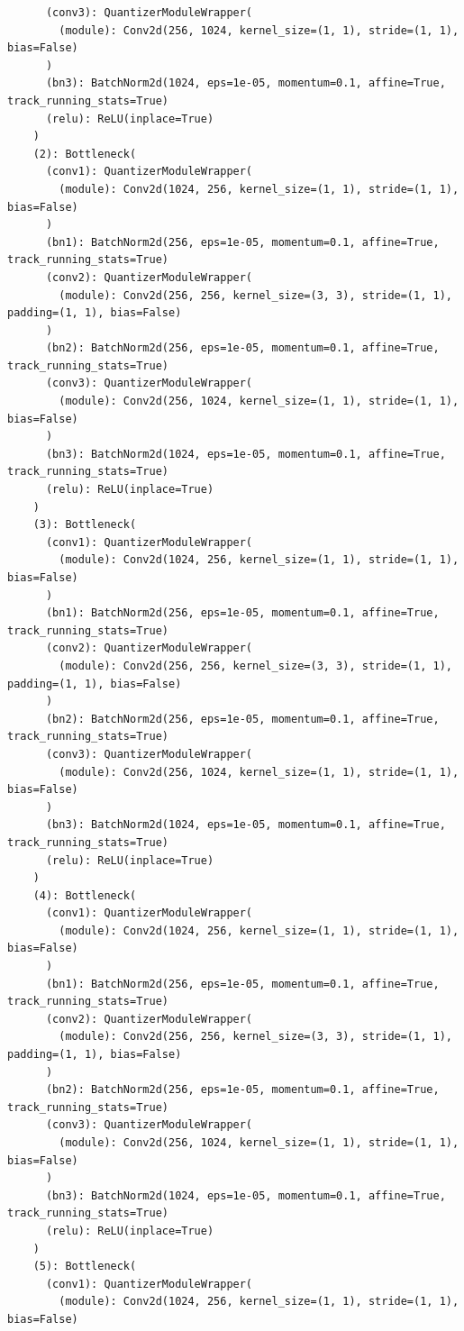 \documentclass{article}
\begin{document}
\begin{verbatim}
      (conv3): QuantizerModuleWrapper(
        (module): Conv2d(256, 1024, kernel_size=(1, 1), stride=(1, 1), bias=False)
      )
      (bn3): BatchNorm2d(1024, eps=1e-05, momentum=0.1, affine=True, track_running_stats=True)
      (relu): ReLU(inplace=True)
    )
    (2): Bottleneck(
      (conv1): QuantizerModuleWrapper(
        (module): Conv2d(1024, 256, kernel_size=(1, 1), stride=(1, 1), bias=False)
      )
      (bn1): BatchNorm2d(256, eps=1e-05, momentum=0.1, affine=True, track_running_stats=True)
      (conv2): QuantizerModuleWrapper(
        (module): Conv2d(256, 256, kernel_size=(3, 3), stride=(1, 1), padding=(1, 1), bias=False)
      )
      (bn2): BatchNorm2d(256, eps=1e-05, momentum=0.1, affine=True, track_running_stats=True)
      (conv3): QuantizerModuleWrapper(
        (module): Conv2d(256, 1024, kernel_size=(1, 1), stride=(1, 1), bias=False)
      )
      (bn3): BatchNorm2d(1024, eps=1e-05, momentum=0.1, affine=True, track_running_stats=True)
      (relu): ReLU(inplace=True)
    )
    (3): Bottleneck(
      (conv1): QuantizerModuleWrapper(
        (module): Conv2d(1024, 256, kernel_size=(1, 1), stride=(1, 1), bias=False)
      )
      (bn1): BatchNorm2d(256, eps=1e-05, momentum=0.1, affine=True, track_running_stats=True)
      (conv2): QuantizerModuleWrapper(
        (module): Conv2d(256, 256, kernel_size=(3, 3), stride=(1, 1), padding=(1, 1), bias=False)
      )
      (bn2): BatchNorm2d(256, eps=1e-05, momentum=0.1, affine=True, track_running_stats=True)
      (conv3): QuantizerModuleWrapper(
        (module): Conv2d(256, 1024, kernel_size=(1, 1), stride=(1, 1), bias=False)
      )
      (bn3): BatchNorm2d(1024, eps=1e-05, momentum=0.1, affine=True, track_running_stats=True)
      (relu): ReLU(inplace=True)
    )
    (4): Bottleneck(
      (conv1): QuantizerModuleWrapper(
        (module): Conv2d(1024, 256, kernel_size=(1, 1), stride=(1, 1), bias=False)
      )
      (bn1): BatchNorm2d(256, eps=1e-05, momentum=0.1, affine=True, track_running_stats=True)
      (conv2): QuantizerModuleWrapper(
        (module): Conv2d(256, 256, kernel_size=(3, 3), stride=(1, 1), padding=(1, 1), bias=False)
      )
      (bn2): BatchNorm2d(256, eps=1e-05, momentum=0.1, affine=True, track_running_stats=True)
      (conv3): QuantizerModuleWrapper(
        (module): Conv2d(256, 1024, kernel_size=(1, 1), stride=(1, 1), bias=False)
      )
      (bn3): BatchNorm2d(1024, eps=1e-05, momentum=0.1, affine=True, track_running_stats=True)
      (relu): ReLU(inplace=True)
    )
    (5): Bottleneck(
      (conv1): QuantizerModuleWrapper(
        (module): Conv2d(1024, 256, kernel_size=(1, 1), stride=(1, 1), bias=False)

\end{verbatim}
\end{document}

